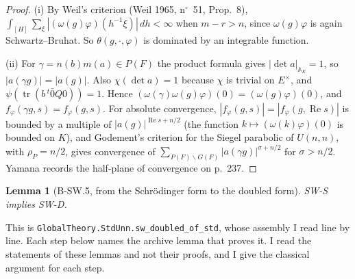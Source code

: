 \documentclass[11pt]{article}
\newcommand{\lean}[1]{\nolinkurl{#1}}
\newtheorem{lemma}{Lemma}
\theoremstyle{definition}
\begin{document}
\begin{proof}
(i) By Weil's criterion (Weil 1965, n$^\circ$~51, Prop.~8), $\int_{[H]}\sum_\xi|(\omega(g)\varphi)(h^{-1}\xi)|\,dh<\infty$ when $m-r>n$, since $\omega(g)\varphi$ is again Schwartz--Bruhat. So $\theta(g,\cdot,\varphi)$ is dominated by an integrable function.

(ii) For $\gamma=n(b)m(a)\in P(F)$ the product formula gives $|\det a|_{\mathbb A_E}=1$, so $|a(\gamma g)|=|a(g)|$. Also $\chi(\det a)=1$ because $\chi$ is trivial on $E^\times$, and $\psi(\operatorname{tr}(b\,{}^t\bar0Q0))=1$. Hence $(\omega(\gamma)\omega(g)\varphi)(0)=(\omega(g)\varphi)(0)$, and $f_\varphi(\gamma g,s)=f_\varphi(g,s)$. For absolute convergence, $|f_\varphi(g,s)|=|f_\varphi(g,\operatorname{Re}s)|$ is bounded by a multiple of $|a(g)|^{\operatorname{Re}s+n/2}$ (the function $k\mapsto(\omega(k)\varphi)(0)$ is bounded on $K$), and Godement's criterion for the Siegel parabolic of $U(n,n)$, with $\rho_P=n/2$, gives convergence of $\sum_{P(F)\backslash G(F)}|a(\gamma g)|^{\sigma+n/2}$ for $\sigma>n/2$. Yamana records the half-plane of convergence on p.~237.
\end{proof}

\begin{lemma}[B-SW.5, from the Schr\"odinger form to the doubled form]\label{lem:dbl}
SW-S implies SW-D.
\end{lemma}

This is \lean{GlobalTheory.StdUnn.sw_doubled_of_std}, whose assembly I read line by line. Each step below names the archive lemma that proves it. I read the statements of these lemmas and not their proofs, and I give the classical argument for each step.
\end{document}
